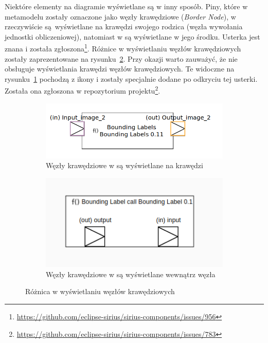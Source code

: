 Niektóre elementy na diagramie wyświetlane są w inny sposób. Piny, które w
metamodelu zostały oznaczone jako węzły krawędziowe (\emph{Border Node}), w
\SiriusDesktop{} rzeczywiście są~wyświetlane na krawędzi swojego rodzica
(węzła wywołania jednostki obliczeniowej), natomiast w \SiriusWeb{} są
wyświetlane w jego środku. Usterka jest znana i została zgłoszona\footnote{
	\url{https://github.com/eclipse-sirius/sirius-components/issues/956}
}. Różnice w wyświetlaniu węzłów krawędziowych zostały zaprezentowane na
rysunku~\ref{rys:border-node-difference}.
Przy okazji warto zauważyć, że \SiriusWeb{} nie obsługuje wyświetlania
krawędzi węzłów krawędziowych. Te widoczne na
rysunku~\ref{rys:border-node-sirius-web} pochodzą z ikony i zostały specjalnie
dodane po odkryciu tej usterki. Została ona zgłoszona w repozytorium
projektu\footnote{
	\url{https://github.com/eclipse-sirius/sirius-components/issues/783}}.

\begin{figure}
	\centering
	\begin{subfigure}{.49\textwidth}
		\centering
		\includegraphics[width=.99\linewidth]{./images/border-node-sirius-desktop.png}
		\caption{Węzły krawędziowe w \SiriusDesktop{} są wyświetlane na
      krawędzi}
	\end{subfigure}
	\begin{subfigure}{.49\textwidth}
		\centering
		\includegraphics[width=.99\linewidth]{./images/border-node-sirius-web.png}
		\caption{Węzły krawędziowe w \SiriusWeb{} są wyświetlane wewnątrz
      węzła}\label{rys:border-node-sirius-web}
	\end{subfigure}

    \caption{Różnica w wyświetlaniu węzłów
      krawędziowych}\label{rys:border-node-difference}
\end{figure}

